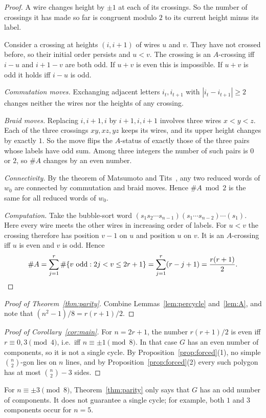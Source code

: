 \begin{proof}
A wire changes height by $\pm1$ at each of its crossings. So the number of crossings it has made so
far is congruent modulo $2$ to its current height minus its label.

Consider a crossing at heights $(i,i+1)$ of wires $u$ and $v$. They have not crossed before, so their
initial order persists and $u<v$. The crossing is an $A$-crossing iff $i-u$ and $i+1-v$ are both odd.
If $u+v$ is even this is impossible. If $u+v$ is odd it holds iff $i-u$ is odd.

\emph{Commutation moves.} Exchanging adjacent letters $i_t,i_{t+1}$ with $|i_t-i_{t+1}|\ge2$ changes
neither the wires nor the heights of any crossing.

\emph{Braid moves.} Replacing $i,i+1,i$ by $i+1,i,i+1$ involves three wires $x<y<z$. Each of the three
crossings $xy,xz,yz$ keeps its wires, and its upper height changes by exactly $1$. So the move flips the
$A$-status of exactly those of the three pairs whose labels have odd sum. Among three integers the
number of such pairs is $0$ or $2$, so $\#A$ changes by an even number.

\emph{Connectivity.} By the theorem of Matsumoto and Tits~\cite{Matsumoto1964}, any two reduced words
of $w_0$ are connected by commutation and braid moves. Hence $\#A \bmod 2$ is the same for all reduced
words of $w_0$.

\emph{Computation.} Take the bubble-sort word $(s_1s_2\cdots s_{n-1})(s_1\cdots s_{n-2})\cdots(s_1)$.
Here every wire meets the other wires in increasing order of labels. For $u<v$ the crossing therefore
has position $v-1$ on $u$ and position $u$ on $v$. It is an $A$-crossing iff $u$ is even and $v$ is
odd. Hence
\[
  \#A=\sum_{j=1}^{r}\#\{v\ \text{odd}: 2j<v\le 2r+1\}=\sum_{j=1}^{r}(r-j+1)=\frac{r(r+1)}2. \qedhere
\]
\end{proof}

\begin{proof}[Proof of Theorem~\ref{thm:parity}]
Combine Lemmas~\ref{lem:percycle} and~\ref{lem:A}, and note that $(n^2-1)/8=r(r+1)/2$.
\end{proof}

\begin{proof}[Proof of Corollary~\ref{cor:main}]
For $n=2r+1$, the number $r(r+1)/2$ is even iff $r\equiv0,3\pmod 4$, i.e.\ iff $n\equiv\pm1\pmod 8$.
In that case $G$ has an even number of components, so it is not a single cycle. By
Proposition~\ref{prop:forced}(1), no simple $\binom n2$-gon lies on $n$ lines, and by Proposition~\ref{prop:forced}(2) every
such polygon has at most $\binom n2-3$ sides.
\end{proof}

\begin{remark}
For $n\equiv\pm3\pmod 8$, Theorem~\ref{thm:parity} only says that $G$ has an odd number of components. It does
not guarantee a single cycle; for example, both $1$ and $3$ components occur for $n=5$.
\end{remark}
